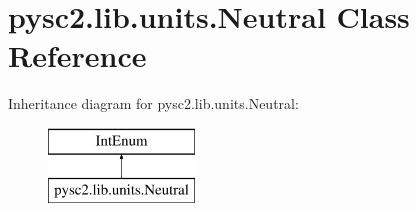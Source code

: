 \hypertarget{classpysc2_1_1lib_1_1units_1_1_neutral}{}\section{pysc2.\+lib.\+units.\+Neutral Class Reference}
\label{classpysc2_1_1lib_1_1units_1_1_neutral}
Inheritance diagram for pysc2.\+lib.\+units.\+Neutral\+:\begin{figure}[H]
\begin{center}
\leavevmode
\includegraphics[height=2.000000cm]{classpysc2_1_1lib_1_1units_1_1_neutral}
\end{center}
\end{figure}
